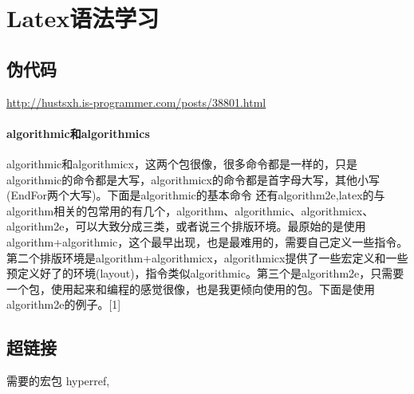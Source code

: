 \section{Latex语法学习}
\subsection{伪代码}
\href{伪代码}{http://hustsxh.is-programmer.com/posts/38801.html}
\paragraph{algorithmic和algorithmics}
algorithmic和algorithmicx，这两个包很像，很多命令都是一样的，只是algorithmic的命令都是大写，algorithmicx的命令都是首字母大写，其他小写(EndFor两个大写)。下面是algorithmic的基本命令
还有algorithm2e,latex的与algorithm相关的包常用的有几个，algorithm、algorithmic、algorithmicx、algorithm2e，可以大致分成三类，或者说三个排版环境。最原始的是使用algorithm+algorithmic，这个最早出现，也是最难用的，需要自己定义一些指令。第二个排版环境是algorithm+algorithmicx，algorithmicx提供了一些宏定义和一些预定义好了的环境(layout)，指令类似algorithmic。第三个是algorithm2e，只需要一个包，使用起来和编程的感觉很像，也是我更倾向使用的包。下面是使用algorithm2e的例子。[1]
\subsection{超链接}
需要的宏包 hyperref, 